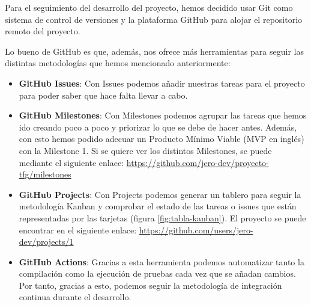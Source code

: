Para el seguimiento del desarrollo del proyecto, hemos decidido usar Git como 
sistema de control de versiones y la plataforma GitHub para alojar el repositorio 
remoto del proyecto.

Lo bueno de GitHub es que, además, nos ofrece más herramientas para seguir las 
distintas metodologías que hemos mencionado anteriormente:

\begin{itemize}
    \item \textbf{GitHub Issues}: Con Issues podemos añadir nuestras tareas para el 
    proyecto para poder saber que hace falta llevar a cabo.
    \item \textbf{GitHub Milestones}: Con Milestones podemos agrupar las tareas que 
    hemos ido creando poco a poco y priorizar lo que se debe de hacer antes. 
    Además, con esto hemos podido adecuar un Producto Mínimo Viable (MVP en inglés) 
    con la Milestone 1. Si se quiere ver los distintos Milestones, se puede 
    mediante el siguiente enlace: 
    \url{https://github.com/jero-dev/proyecto-tfg/milestones}
    \item \textbf{GitHub Projects}: Con Projects podemos generar un tablero para 
    seguir la metodología Kanban y comprobar el estado de las tareas o issues que 
    están representadas por las tarjetas (figura \ref{fig:tabla-kanban}). El 
    proyecto se puede encontrar en el siguiente enlace: 
    \url{https://github.com/users/jero-dev/projects/1}
    \item \textbf{GitHub Actions}: Gracias a esta herramienta podemos automatizar 
    tanto la compilación como la ejecución de pruebas cada vez que se añadan 
    cambios. Por tanto, gracias a esto, podemos seguir la metodología de 
    integración continua durante el desarrollo.
\end{itemize}
